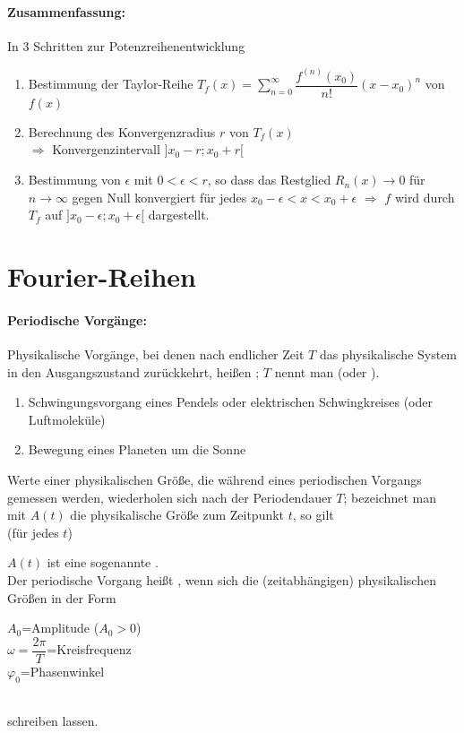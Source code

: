 \paragraph{Zusammenfassung:} In 3 Schritten zur Potenzreihenentwicklung
\begin{enumerate}
	\item Bestimmung der Taylor-Reihe $T_f(x)=\sum\limits_{n=0}^{\infty}\dfrac{f^{(n)}(x_0)}{n!}(x-x_0)^n$ von $f(x)$
	
	\item Berechnung des Konvergenzradius $r$ von $T_f(x)$\\
	$\Rightarrow$ Konvergenzintervall ${]x_0-r;x_0+r[}$
	
	\item Bestimmung von $\epsilon$ mit $0<\epsilon<r$, so dass das Restglied $R_n(x)\to0$ für $n\to\infty$ gegen Null konvergiert für jedes $x_0-\epsilon<x<x_0+\epsilon$ $\Rightarrow$ $f$ wird durch $T_f$ auf ${]x_0-\epsilon;x_0+\epsilon[}$ dargestellt.
\end{enumerate}

\clearpage
\section{Fourier-Reihen}
\paragraph{Periodische Vorgänge:} Physikalische Vorgänge, bei denen nach endlicher Zeit $T$ das physikalische System in den Ausgangszustand zurückkehrt, heißen ; $T$ nennt man  (oder ).

\Bsp
\begin{enumerate}
	\item Schwingungsvorgang eines Pendels oder elektrischen Schwingkreises (oder Luftmoleküle)
	\item Bewegung eines Planeten um die Sonne
\end{enumerate}

Werte einer physikalischen Größe, die während eines periodischen Vorgangs gemessen werden, wiederholen sich nach der Periodendauer $T$; bezeichnet man mit $A(t)$ die physikalische Größe zum Zeitpunkt $t$, so gilt\\
\hhspace{2cm}\quad(für jedes $t$)

$A(t)$ ist eine sogenannte .\\
Der periodische Vorgang heißt , wenn sich die (zeitabhängigen) physikalischen Größen in der Form\\
\hhspace{2cm}\quad\parbox{5cm}{$A_0$=Amplitude ($A_0>0$)\\$\omega=\dfrac{2\pi}{T}$=Kreisfrequenz\\$\varphi_0$=Phasenwinkel}\\
schreiben lassen.

